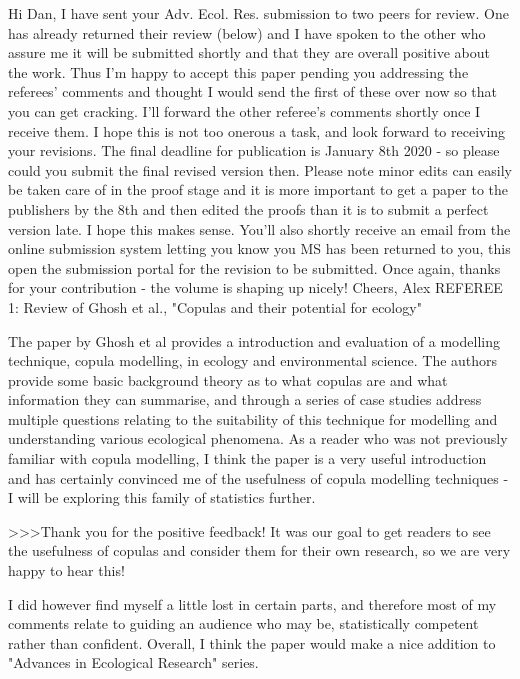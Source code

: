 Hi Dan,
I have sent your Adv. Ecol. Res. submission to two peers for review. One has already returned their review (below) and I have spoken to the other who assure me it will be submitted shortly and that they are overall positive about the work. Thus I'm happy to accept this paper pending you addressing the referees' comments and thought I would send the first of these over now so that you can get cracking. I'll forward the other referee's comments shortly once I receive them. I hope this is not too onerous a task, and look forward to receiving your revisions. The final deadline for publication is January 8th 2020 - so please could you submit the final revised version then. Please note minor edits can easily be taken care of in the proof stage and it is more important to get a paper to the publishers by the 8th and then edited the proofs than it is to submit a perfect version late. I hope this makes sense. You'll also shortly receive an email from the online submission system letting you know you MS has been returned to you, this open the submission portal for the revision to be submitted. Once again, thanks for your contribution - the volume is shaping up nicely!
Cheers,
Alex
REFEREE 1:
Review of Ghosh et al., "Copulas and their potential for ecology"


The paper by Ghosh et al provides a introduction and evaluation of a modelling technique, 
copula modelling, in ecology and environmental science. The authors provide some basic 
background theory as to what copulas are and what information they can summarise, and through 
a series of case studies address multiple questions relating to the suitability of this technique 
for modelling and understanding various ecological phenomena. As a reader who was not previously 
familiar with copula modelling, I think the paper is a very useful introduction and has certainly 
convinced me of the usefulness of copula modelling techniques - I will be exploring this family 
of statistics further. 

>>>Thank you for the positive feedback! It was our goal to get readers to see the usefulness of 
copulas and consider them for their own research, so we are very happy to hear this!

I did however find myself a little lost in certain parts, and therefore most of my comments relate 
to guiding an audience who may be, statistically competent rather than confident. Overall, I 
think the paper would make a nice addition to "Advances in Ecological Research" series.

